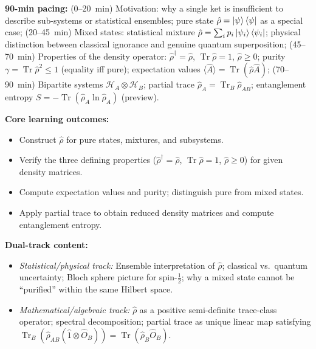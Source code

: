 \documentclass[11pt,a4paper]{article}
\begin{document}
\begin{tcolorbox}[modulebox, title={Module~I.3 --- Lecture L01 (cont.): Pure/Mixed States and the Density Matrix (\S2.3--2.5)}]
\textbf{90-min pacing:} (0--20~min) Motivation: why a single ket is insufficient to describe
sub-systems or statistical ensembles; pure state $\hat{\rho}=\ket{\psi}\bra{\psi}$ as
a special case;
(20--45~min) Mixed states: statistical mixture $\hat{\rho}=\sum_i p_i\ket{\psi_i}\bra{\psi_i}$;
physical distinction between classical ignorance and genuine quantum superposition;
(45--70~min) Properties of the density operator: $\hat{\rho}^\dagger=\hat{\rho}$,
$\operatorname{Tr}\hat{\rho}=1$, $\hat{\rho}\geq 0$; purity
$\gamma=\operatorname{Tr}\hat{\rho}^2\leq 1$ (equality iff pure);
expectation values $\langle\hat{A}\rangle=\operatorname{Tr}(\hat{\rho}\hat{A})$;
(70--90~min) Bipartite systems $\mathcal{H}_A\otimes\mathcal{H}_B$; partial trace
$\hat{\rho}_A=\operatorname{Tr}_B\hat{\rho}_{AB}$; entanglement entropy
$S=-\operatorname{Tr}(\hat{\rho}_A\ln\hat{\rho}_A)$ (preview).

\medskip\textbf{Core learning outcomes:}
\begin{itemize}[leftmargin=1.4em,topsep=2pt,itemsep=1pt]
  \item Construct $\hat{\rho}$ for pure states, mixtures, and subsystems.
  \item Verify the three defining properties ($\hat{\rho}^\dagger=\hat{\rho}$,
    $\operatorname{Tr}\hat{\rho}=1$, $\hat{\rho}\geq 0$) for given density matrices.
  \item Compute expectation values and purity; distinguish pure from mixed states.
  \item Apply partial trace to obtain reduced density matrices and compute entanglement entropy.
\end{itemize}

\medskip\textbf{Dual-track content:}
\begin{itemize}[leftmargin=1.4em,topsep=2pt,itemsep=1pt]
  \item \textit{Statistical/physical track:} Ensemble interpretation of $\hat{\rho}$;
    classical vs.\ quantum uncertainty; Bloch sphere picture for spin-$\tfrac{1}{2}$;
    why a mixed state cannot be ``purified'' within the same Hilbert space.
  \item \textit{Mathematical/algebraic track:} $\hat{\rho}$ as a positive semi-definite
    trace-class operator; spectral decomposition; partial trace as unique linear map
    satisfying $\operatorname{Tr}_B(\hat{\rho}_{AB}(\hat{1}\otimes\hat{O}_B))
    =\operatorname{Tr}(\hat{\rho}_B\hat{O}_B)$.
\end{itemize}


\end{tcolorbox}
\end{document}
